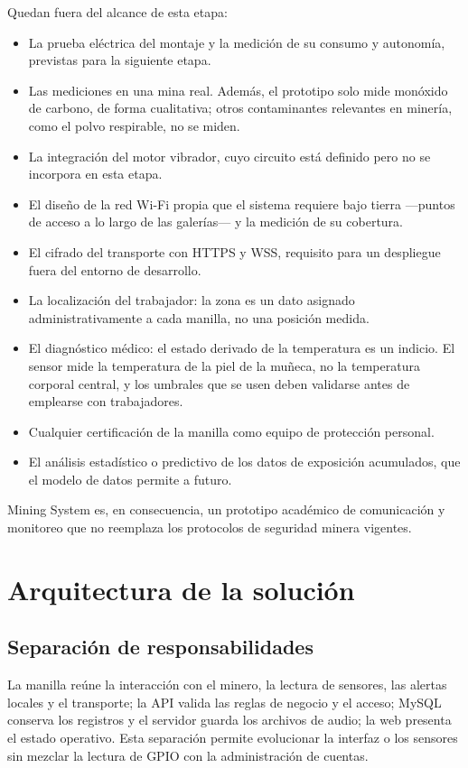 \documentclass[10pt,a4paper]{article}
\newcommand{\newsection}[1]{\clearpage\section{#1}}
\begin{document}
Quedan fuera del alcance de esta etapa:
\begin{itemize}
\item La prueba eléctrica del montaje y la medición de su consumo y autonomía, previstas para la siguiente etapa.
\item Las mediciones en una mina real. Además, el prototipo solo mide monóxido de carbono, de forma cualitativa; otros contaminantes relevantes en minería, como el polvo respirable, no se miden.
\item La integración del motor vibrador, cuyo circuito está definido pero no se incorpora en esta etapa.
\item El diseño de la red Wi-Fi propia que el sistema requiere bajo tierra —puntos de acceso a lo largo de las galerías— y la medición de su cobertura.
\item El cifrado del transporte con HTTPS y WSS, requisito para un despliegue fuera del entorno de desarrollo.
\item La localización del trabajador: la zona es un dato asignado administrativamente a cada manilla, no una posición medida.
\item El diagnóstico médico: el estado derivado de la temperatura es un indicio. El sensor mide la temperatura de la piel de la muñeca, no la temperatura corporal central, y los umbrales que se usen deben validarse antes de emplearse con trabajadores.
\item Cualquier certificación de la manilla como equipo de protección personal.
\item El análisis estadístico o predictivo de los datos de exposición acumulados, que el modelo de datos permite a futuro.
\end{itemize}
Mining System es, en consecuencia, un prototipo académico de comunicación y monitoreo que no reemplaza los protocolos de seguridad minera vigentes.

\newsection{Arquitectura de la solución}
\label{sec:arquitectura}
\subsection{Separación de responsabilidades}
La manilla reúne la interacción con el minero, la lectura de sensores, las alertas locales y el transporte; la API valida las reglas de negocio y el acceso; MySQL conserva los registros y el servidor guarda los archivos de audio; la web presenta el estado operativo. Esta separación permite evolucionar la interfaz o los sensores sin mezclar la lectura de GPIO con la administración de cuentas.
\end{document}
